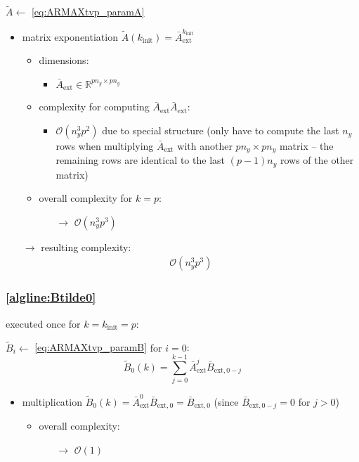 \documentclass{article}
\begin{document}
$\tilde{A} \gets$ \cref{eq:ARMAXtvp_paramA}
\begin{itemize}
    \item matrix exponentiation $\tilde{A}(k_{\text{init}}) = \bar{A}_\text{ext}^{k_{\text{init}}}$
    \begin{itemize}
        \item dimensions:
        \begin{itemize}
            \item $\bar{A}_\text{ext} \in \mathbb{R}^{pn_y \times pn_y}$
        \end{itemize}
        \item complexity for computing $\bar{A}_\text{ext} \bar{A}_\text{ext}$:
        \begin{itemize}
            \item $\mathcal{O}(n_y^3 p^2)$ due to special structure (only have to compute the last $n_y$ rows when multiplying $\bar{A}_\text{ext}$ with another $pn_y \times pn_y$ matrix -- the remaining rows are identical to the last $(p-1)n_y$ rows of the other matrix)
        \end{itemize}        
        \item overall complexity for $k=p$:
        \begin{itemize}
            \item[$\rightarrow$] $\mathcal{O}(n_y^3 p^3)$
        \end{itemize}
    \end{itemize}
    \item[$\rightarrow$] resulting complexity: \begin{align*}
        \mathcal{O}(n_y^3 p^3)
    \end{align*}
\end{itemize}

\subsubsection{\cref{algline:Btilde0}} \label{sec:line3}
executed once for $k=k_{\text{init}}=p$:

$\tilde{B}_i \gets$ \cref{eq:ARMAXtvp_paramB}{ \small for $i=0$}: 
$$\tilde{B}_{0}(k) =  \sum_{j=0}^{k-1} \bar{A}_\text{ext}^{j} \bar{B}_{\text{ext},0-j}$$
\begin{itemize}
    \item multiplication $\tilde{B}_{0}(k) =  \bar{A}_\text{ext}^{0} \bar{B}_{\text{ext},0} = \bar{B}_{\text{ext},0}$ (since $\bar{B}_{\text{ext},0-j}= 0$ for $j>0$) 
    \begin{itemize}        
        \item overall complexity:
        \begin{itemize}
            \item[$\rightarrow$] $\mathcal{O}(1)$
        \end{itemize}
    \end{itemize}
\end{itemize}
\end{document}

